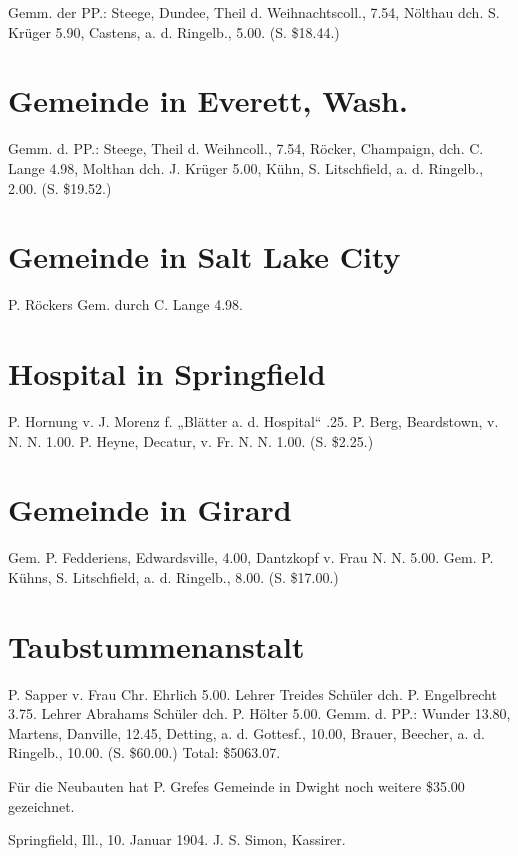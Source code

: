 Gemm. der PP.: Steege, Dundee, Theil d. Weihnachtscoll., 7.54, Nölthau dch. S. Krüger 5.90, Castens, a. d. Ringelb., 5.00. (S. \$18.44.)

\section{Gemeinde in Everett, Wash.}

Gemm. d. PP.: Steege, Theil d. Weihncoll., 7.54, Röcker, Champaign, dch. C. Lange 4.98, Molthan dch. J. Krüger 5.00, Kühn, S. Litschfield, a. d. Ringelb., 2.00. (S. \$19.52.)

\section{Gemeinde in Salt Lake City}

P. Röckers Gem. durch C. Lange 4.98.

\section{Hospital in Springfield}

P. Hornung v. J. Morenz f. „Blätter a. d. Hospital“ .25. P. Berg, Beardstown, v. N. N. 1.00. P. Heyne, Decatur, v. Fr. N. N. 1.00. (S. \$2.25.)

\section{Gemeinde in Girard}

Gem. P. Fedderiens, Edwardsville, 4.00, Dantzkopf v. Frau N. N. 5.00. Gem. P. Kühns, S. Litschfield, a. d. Ringelb., 8.00. (S. \$17.00.)

\section{Taubstummenanstalt}

P. Sapper v. Frau Chr. Ehrlich 5.00. Lehrer Treides Schüler dch. P. Engelbrecht 3.75. Lehrer Abrahams Schüler dch. P. Hölter 5.00. Gemm. d. PP.: Wunder 13.80, Martens, Danville, 12.45, Detting, a. d. Gottesf., 10.00, Brauer, Beecher, a. d. Ringelb., 10.00. (S. \$60.00.) Total: \$5063.07.

Für die Neubauten hat P. Grefes Gemeinde in Dwight noch weitere \$35.00 gezeichnet.

Springfield, Ill., 10. Januar 1904. J. S. Simon, Kassirer.
